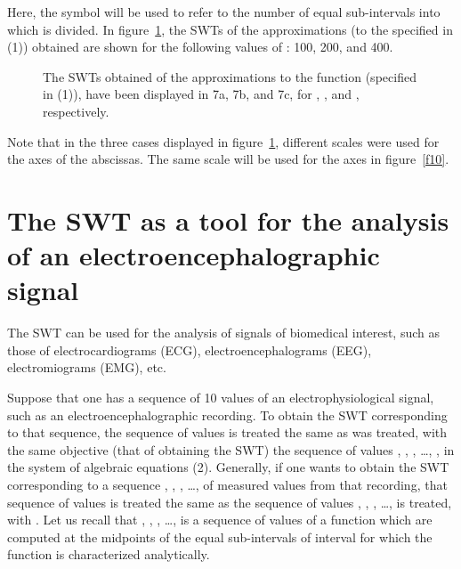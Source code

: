 \documentclass[11pt]{rMTA2010} \usepackage[utf8]{inputenc} \usepackage{graphicx} \usepackage{booktabs} \usepackage{array} \usepackage{enumerate}
\begin{document}
Here, the symbol  will be used to refer to the number of equal sub-intervals into which  is divided. In figure~\ref{f7}, the SWTs of the approximations (to the  specified in (1)) obtained are shown for the following values of : 100, 200, and 400.

\begin{figure}
\centering
{}\qquad
{}\qquad
\caption[]{}
\end{figure}

\begin{figure}
\ContinuedFloat
{}\qquad
\caption{The SWTs obtained of the approximations to the function  (specified in (1)), have been displayed in 7a, 7b, and 7c, for , , and , respectively.}
\label{f7}
\end{figure}
\newpage
Note that in the three cases displayed in figure~\ref{f7}, different scales were used for the axes of the abscissas. The same scale will be used for the axes in figure~\ref{f10}.

\section{The SWT as a tool for the analysis of an electroencephalographic signal}

The SWT can be used for the analysis of signals of biomedical interest, such as those of electrocardiograms (ECG), electroencephalograms (EEG), electromiograms (EMG), etc.

Suppose that one has a sequence of 10 values of an electrophysiological signal, such as an electroencephalographic recording. To obtain the SWT corresponding to that sequence, the sequence of values is treated the same as was treated, with the same objective (that of obtaining the SWT) the sequence of values , , , \ldots, , in the system of algebraic equations (2). Generally, if one wants to obtain the SWT corresponding to a sequence , , , \ldots,  of measured values from that recording, that sequence of values is treated the same as the sequence of values  , , , \ldots,  is treated, with . Let us recall that , , , \ldots,  is a sequence of values of a function which are computed at the midpoints of the  equal sub-intervals of interval  for which the function is characterized analytically.
\end{document}
